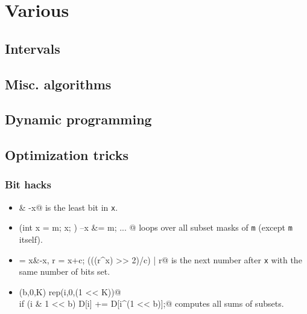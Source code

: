 \chapter{Various}

\section{Intervals}

\section{Misc. algorithms}

\section{Dynamic programming}

\section{Optimization tricks}
\subsection{Bit hacks}
\begin{itemize}
	\item \verb@x & -x@ is the least bit in \texttt{x}.
	\item \verb@for (int x = m; x; ) { --x &= m; ... }@ loops over all subset masks of \texttt{m} (except \texttt{m} itself).
	\item \verb@c = x&-x, r = x+c; (((r^x) >> 2)/c) | r@ is the next number after \texttt{x} with the same number of bits set.
	\item \verb@rep(b,0,K) rep(i,0,(1 << K))@ \\ \verb@  if (i & 1 << b) D[i] += D[i^(1 << b)];@ computes all sums of subsets.
\end{itemize}

